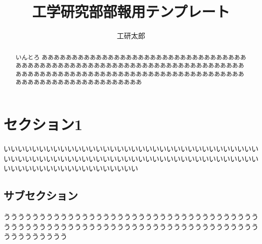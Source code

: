 \documentclass[dvipdfmx,a4j,twocolumn,12pt,uplatex]{jsarticle}
\title{工学研究部部報用テンプレート}
\date{}
\author{工研太郎}
\begin{document}
\begin{abstract}
  \vspace*{-2em}
  \centering
  いんとろ
  あああああああああああああああああああああああああああああああああああああああああああああああああああああああああああああああああああああああああああああああああああああああああああああああああああああああああああああああああああああああああああああああああああ
\end{abstract}

\maketitle
\pagestyle{fancy}

\section{セクション1}
いいいいいいいいいいいいいいいいいいいいいいいいいいいいいいいいいいいいいいいいいいいいいいいいいいいいいいいいいいいいいいいいいいいいいいいいいいいいいいいいいいいいいいいいいいい

\subsection{サブセクション}
ううううううううううううううううううううううううううううううううううううううううううううううううううううううううううううううううううううううううううううううううう
\end{document}
